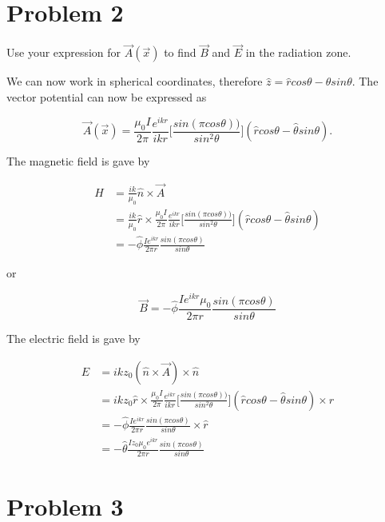 \documentclass[11pt]{article}
\begin{document}
\section*{Problem 2}

Use your expression for $\vec{A}(\vec{x})$ to find $\vec{B}$ and $\vec{E}$ in the radiation zone.

We can now work in spherical coordinates, therefore $\hat{z} = \hat{r} cos \theta - \hat{\theta} sin \theta$. The vector potential can now be expressed as 

$$
\vec{A}(\vec{x}) = \frac{\mu_{0} I}{2\pi} \frac{e^{ikr}}{ikr} \Bigg[ \frac{sin(\pi cos \theta))}{sin^{2} \theta} \Bigg](\hat{r} cos \theta - \hat{\theta} sin \theta).
$$

The magnetic field is gave by

\begin{align*}
H &= \frac{ik}{\mu_{0}}\hat{n} \times \vec{A} \\
  &= \frac{ik}{\mu_{0}} \hat{r} \times \frac{\mu_{0} I}{2\pi} \frac{e^{ikr}}{ikr} \Bigg[ \frac{sin(\pi cos \theta))}{sin^{2} \theta} \Bigg](\hat{r} cos \theta - \hat{\theta} sin \theta) \\
  &= -\hat{\phi} \frac{Ie^{ikr}}{2\pi r} \frac{sin(\pi cos \theta)}{sin \theta}
\end{align*}

or 

$$
\vec{B} = -\hat{\phi} \frac{Ie^{ikr} \mu_{0}}{2\pi r} \frac{sin(\pi cos \theta)}{sin \theta}
$$

The electric field is gave by

\begin{align*}
E &= ikz_{0} (\hat{n} \times \vec{A}) \times \hat{n} \\
  &= ikz_{0} \hat{r} \times \frac{\mu_{0} I}{2\pi} \frac{e^{ikr}}{ikr} \Bigg[ \frac{sin(\pi cos \theta))}{sin^{2} \theta} \Bigg](\hat{r} cos \theta - \hat{\theta} sin \theta) \times \hat{r} \\
  &= -\hat{\phi} \frac{Ie^{ikr}}{2\pi r} \frac{sin(\pi cos \theta)}{sin \theta} \times \hat{r} \\
  &= -\hat{\theta} \frac{Iz_{0} \mu_{0} e^{ikr}}{2\pi r} \frac{sin(\pi cos \theta)}{sin \theta} 
\end{align*}

\clearpage

\section*{Problem 3}
\end{document}
